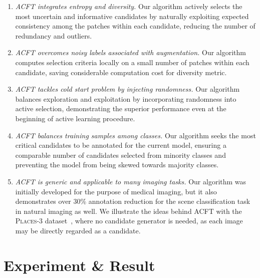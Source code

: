 \begin{enumerate}[noitemsep]

    \item \textit{ACFT integrates entropy and diversity.} Our algorithm actively selects the most uncertain and informative candidates by naturally exploiting expected consistency among the patches within each candidate, reducing the number of redundancy and outliers. 
    
    \item \textit{ACFT overcomes noisy labels associated with augmentation.} Our algorithm computes selection criteria locally on a small number of patches within each candidate, saving considerable computation cost for diversity metric.
    
    \item \textit{ACFT tackles cold start problem by injecting randomness.} Our algorithm balances exploration and exploitation by incorporating randomness into active selection, demonstrating the superior performance even at the beginning of active learning procedure.
    
    \item \textit{ACFT balances training samples among classes.} Our algorithm seeks the most critical candidates to be annotated for the current model, ensuring a comparable number of candidates selected from minority classes and preventing the model from being skewed towards majority classes.
    
    \item \textit{ACFT is generic and applicable to many imaging tasks.} Our algorithm was initially developed for the purpose of medical imaging, but it also demonstrates over 30\% annotation reduction for the scene classification task in natural imaging as well. We illustrate the ideas behind ACFT with the \textsc{Places-3} dataset~\citep{zhou2017places}, where no candidate generator is needed, as each image may be directly regarded as a candidate. 

\end{enumerate}



\section{Experiment \& Result}
\label{ch3:experiment_result}

